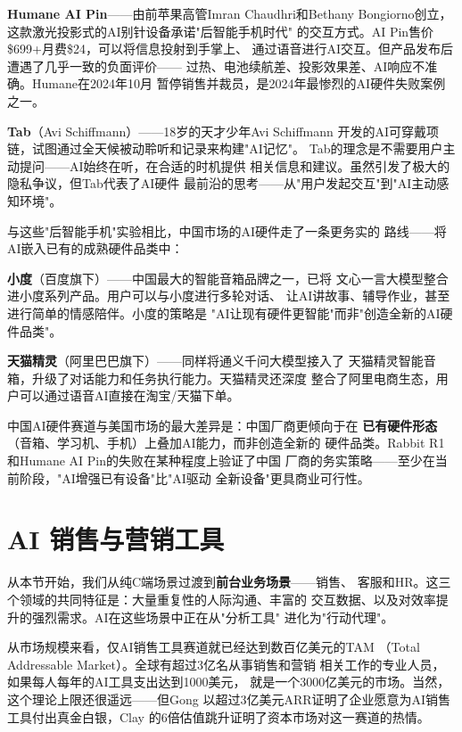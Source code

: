 \textbf{Humane AI Pin}——由前苹果高管Imran Chaudhri和Bethany
Bongiorno创立，这款激光投影式的AI别针设备承诺"后智能手机时代"
的交互方式。AI Pin售价\$699+月费\$24，可以将信息投射到手掌上、
通过语音进行AI交互。但产品发布后遭遇了几乎一致的负面评价——
过热、电池续航差、投影效果差、AI响应不准确。Humane在2024年10月
暂停销售并裁员，是2024年最惨烈的AI硬件失败案例之一。

\textbf{Tab}（Avi Schiffmann）——18岁的天才少年Avi Schiffmann
开发的AI可穿戴项链，试图通过全天候被动聆听和记录来构建"AI记忆"。
Tab的理念是不需要用户主动提问——AI始终在听，在合适的时机提供
相关信息和建议。虽然引发了极大的隐私争议，但Tab代表了AI硬件
最前沿的思考——从"用户发起交互"到"AI主动感知环境"。

与这些"后智能手机"实验相比，中国市场的AI硬件走了一条更务实的
路线——将AI嵌入已有的成熟硬件品类中：

\textbf{小度}（百度旗下）——中国最大的智能音箱品牌之一，已将
文心一言大模型整合进小度系列产品。用户可以与小度进行多轮对话、
让AI讲故事、辅导作业，甚至进行简单的情感陪伴。小度的策略是
"AI让现有硬件更智能"而非"创造全新的AI硬件品类"。

\textbf{天猫精灵}（阿里巴巴旗下）——同样将通义千问大模型接入了
天猫精灵智能音箱，升级了对话能力和任务执行能力。天猫精灵还深度
整合了阿里电商生态，用户可以通过语音AI直接在淘宝/天猫下单。

中国AI硬件赛道与美国市场的最大差异是：中国厂商更倾向于在\textbf{
已有硬件形态}（音箱、学习机、手机）上叠加AI能力，而非创造全新的
硬件品类。Rabbit R1和Humane AI Pin的失败在某种程度上验证了中国
厂商的务实策略——至少在当前阶段，"AI增强已有设备"比"AI驱动
全新设备"更具商业可行性。


\section{AI 销售与营销工具}
\label{sec:social-sales}

从本节开始，我们从纯C端场景过渡到\textbf{前台业务场景}——销售、
客服和HR。这三个领域的共同特征是：大量重复性的人际沟通、丰富的
交互数据、以及对效率提升的强烈需求。AI在这些场景中正在从"分析工具"
进化为"行动代理"。

从市场规模来看，仅AI销售工具赛道就已经达到数百亿美元的TAM
（Total Addressable Market）。全球有超过3亿名从事销售和营销
相关工作的专业人员，如果每人每年的AI工具支出达到1000美元，
就是一个3000亿美元的市场。当然，这个理论上限还很遥远——但Gong
以超过3亿美元ARR证明了企业愿意为AI销售工具付出真金白银，Clay
的6倍估值跳升证明了资本市场对这一赛道的热情。

